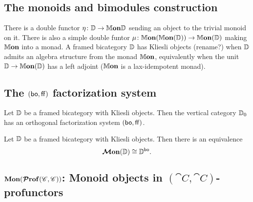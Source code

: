 \documentclass[12pt,oneside,article,draft]{memoir}
\begin{document}


\subsection{The monoids and bimodules construction}
There is a double functor $\eta\colon\mathbb{D}\to\mathbb{M}\mathbf{on}{\mathbb{D}}$ sending an object to the trivial monoid on it. There is also a simple double funtor $\mu\colon\mathbb{M}\mathbf{on}(\mathbb{M}\mathbf{on}(\mathbb{D}))\to\mathbb{M}\mathbf{on}(\mathbb{D})$ making $\mathbb{M}\mathbf{on}$ into a monad.
A framed bicategory $\mathbb{D}$ has Kliesli objects (rename?) when $\mathbb{D}$ admits an algebra structure from the monad $\mathbb{M}\mathbf{on}$, equivalently when the unit $\mathbb{D}\to\mathbb{M}\mathbf{on}(\mathbb{D})$ has a left adjoint ($\mathbb{M}\mathbf{on}$ is a lax-idempotent monad).

\subsection{The $(\mathsf{bo},\mathsf{ff})$ factorization system}

\begin{theorem}
	Let $\mathbb{D}$ be a framed bicategory with Kliesli objects. Then the vertical category $\mathbb{D}_0$ has an orthogonal factorization system $(\mathsf{bo},\mathsf{ff})$.
\end{theorem}

\begin{theorem}
	Let $\mathbb{D}$ be a framed bicategory with Kliesli objects. Then there is an equivalence
	\[
		\bm{\mathcal{M}}\mathbf{on}(\mathbb{D}) \cong \mathbb{D}^{\mathsf{bo}}.
	\]
\end{theorem}

\subsection{$\mathbf{Mon}(\bm{\mathcal{P}}\mathbf{rof}(\mathscr{C},\mathscr{C}))$: Monoid objects in $(\cat{C},\cat{C})$-profunctors}
\end{document}

